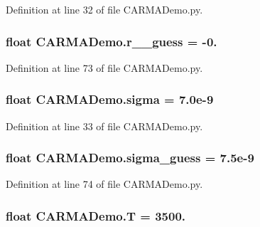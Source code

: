 Definition at line 32 of file C\-A\-R\-M\-A\-Demo.\-py.

\hypertarget{namespace_c_a_r_m_a_demo_a2e51a245e221cda099201dff37dd968a}{
\subsubsection[{r\-\_\-3\-\_\-guess}]{\setlength{\rightskip}{0pt plus 5cm}float C\-A\-R\-M\-A\-Demo.\-r\-\_\-\_\-guess = -\/0.}}\label{namespace_c_a_r_m_a_demo_a2e51a245e221cda099201dff37dd968a}


Definition at line 73 of file C\-A\-R\-M\-A\-Demo.\-py.

\hypertarget{namespace_c_a_r_m_a_demo_a9784ff8e7b9633d4c1cf8d882bf51c9d}{
\subsubsection[{sigma}]{\setlength{\rightskip}{0pt plus 5cm}float C\-A\-R\-M\-A\-Demo.\-sigma = 7.\-0e-\/9}}\label{namespace_c_a_r_m_a_demo_a9784ff8e7b9633d4c1cf8d882bf51c9d}


Definition at line 33 of file C\-A\-R\-M\-A\-Demo.\-py.

\hypertarget{namespace_c_a_r_m_a_demo_a00552ce8d2ff001c98731086d3221a4b}{
\subsubsection[{sigma\-\_\-guess}]{\setlength{\rightskip}{0pt plus 5cm}float C\-A\-R\-M\-A\-Demo.\-sigma\-\_\-guess = 7.\-5e-\/9}}\label{namespace_c_a_r_m_a_demo_a00552ce8d2ff001c98731086d3221a4b}


Definition at line 74 of file C\-A\-R\-M\-A\-Demo.\-py.

\hypertarget{namespace_c_a_r_m_a_demo_ad48924984a4bff8b24fbada6f1e04893}{
\subsubsection[{T}]{\setlength{\rightskip}{0pt plus 5cm}float C\-A\-R\-M\-A\-Demo.\-T = 3500.}}\label{namespace_c_a_r_m_a_demo_ad48924984a4bff8b24fbada6f1e04893}


